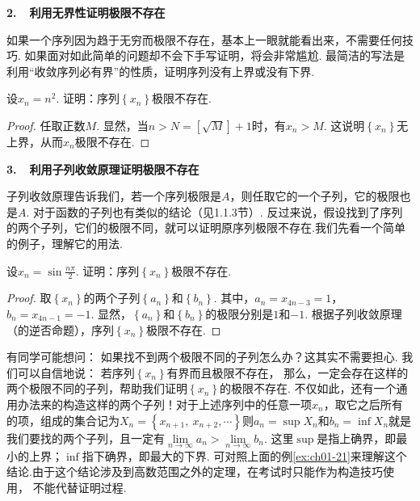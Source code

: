 \textbf{2.~~利用无界性证明极限不存在}\vspace{0.25em}

如果一个序列因为趋于无穷而极限不存在，基本上一眼就能看出来，不需要任何技巧. 如果面对如此简单的问题却不会下手写证明，将会非常尴尬.
最简洁的写法是利用“收敛序列必有界”的性质，证明序列没有上界或没有下界.

\begin{example}
\label{ex:ch01-20}
设$x_{n}=n^2$. 证明：序列$\left\{ x_{n} \right\}$极限不存在.
\end{example}

\begin{proof}
任取正数$M$.
 显然，当$n>N=[\sqrt{M}]+1$时，有$x_{n}>M$.
 这说明$\left\{ x_{n} \right\}$无上界，从而$x_{n}$极限不存在.
\end{proof}

\textbf{3.~~利用子列收敛原理证明极限不存在}\vspace{0.5em}

子列收敛原理告诉我们，若一个序列极限是$A$，则任取它的一个子列，它的极限也是$A$. 对于函数的子列也有类似的结论（见1.1.3节）.
反过来说，假设找到了序列的两个子列，它们的极限不同，就可以证明原序列极限不存在.我们先看一个简单的例子，理解它的用法.

\begin{example}
\label{ex:ch01-21}
设$x_{n}=\sin \displaystyle\frac{n\pi}{2}$. 证明：序列$\left\{ x_{n} \right\}$极限不存在.
\end{example}

\begin{proof}
取$\left\{ x_{n} \right\}$的两个子列$\left\{ a_{n} \right\}$和$\left\{ b_{n} \right\}$. 其中，$a_{n}=x_{4n-3}=1$，
$b_{n}=x_{4n-1}=-1$. 显然，$\left\{ a_{n} \right\}$和$\left\{ b_{n} \right\}$的极限分别是$1$和$-1$. 根据子列收敛原理（的逆否命题），序列$\left\{ x_{n} \right\}$极限不存在.
\end{proof}

有同学可能想问：
如果找不到两个极限不同的子列怎么办？这其实不需要担心.
我们可以自信地说：
若序列$\left\{ x_{n} \right\}$有界而且极限不存在，
那么，一定会存在这样的两个极限不同的子列，帮助我们证明$\left\{ x_{n} \right\}$的极限不存在. 不仅如此，还有一个通用办法来的构造这样的两个子列！对于上述序列中的任意一项$x_{n}$，取它之后所有的项，组成的集合记为$X_{n}=\left\{ x_{n+1},~x_{n+2},\cdots \right\} $则$a_{n}=\sup X_{n}$和$b_{n}=\inf X_{n}$就是我们要找的两个子列，且一定有$\lim\limits_{n \to \infty}a_{n}>\lim\limits_{n \to \infty}b_{n}$.
这里$\sup$是指上确界，即最小的上界；$\inf$指下确界，即最大的下界.
可对照上面的例\ref{ex:ch01-21}来理解这个结论.由于这个结论涉及到高数范围之外的定理，在考试时只能作为构造技巧使用，
不能代替证明过程.\vspace{1em}

